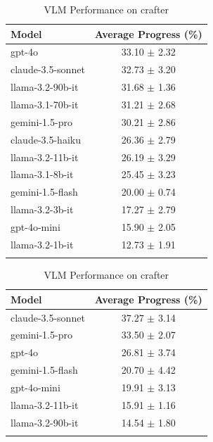 \begin{table}[h]
    \centering
    \begin{minipage}[t]{0.48\linewidth}
    \centering
    \caption{LLM Performance on crafter}
    \begin{tabular}{lc}
    \hline
    Model & Average Progress (\%) \\
    \hline
    gpt-4o & 33.10 $\pm$ 2.32 \\
    claude-3.5-sonnet & 32.73 $\pm$ 3.20 \\
    llama-3.2-90b-it & 31.68 $\pm$ 1.36 \\
    llama-3.1-70b-it & 31.21 $\pm$ 2.68 \\
    gemini-1.5-pro & 30.21 $\pm$ 2.86 \\
    claude-3.5-haiku & 26.36 $\pm$ 2.79 \\
    llama-3.2-11b-it & 26.19 $\pm$ 3.29 \\
    llama-3.1-8b-it & 25.45 $\pm$ 3.23 \\
    gemini-1.5-flash & 20.00 $\pm$ 0.74 \\
    llama-3.2-3b-it & 17.27 $\pm$ 2.79 \\
    gpt-4o-mini & 15.90 $\pm$ 2.05 \\
    llama-3.2-1b-it & 12.73 $\pm$ 1.91 \\
    \hline
    \label{crafter_LLM}
    \end{tabular}
    \end{minipage}
    \hfill
    \begin{minipage}[t]{0.48\linewidth}
    \centering
    \caption{VLM Performance on crafter}
    \begin{tabular}{lc}
    \hline
    Model & Average Progress (\%) \\
    \hline
    claude-3.5-sonnet & 37.27 $\pm$ 3.14 \\
    gemini-1.5-pro & 33.50 $\pm$ 2.07 \\
    gpt-4o & 26.81 $\pm$ 3.74 \\
    gemini-1.5-flash & 20.70 $\pm$ 4.42 \\
    gpt-4o-mini & 19.91 $\pm$ 3.13 \\
    llama-3.2-11b-it & 15.91 $\pm$ 1.16 \\
    llama-3.2-90b-it & 14.54 $\pm$ 1.80 \\
    \hline
    \label{crafter_VLM}
    \end{tabular}
\end{minipage}

\end{table}

